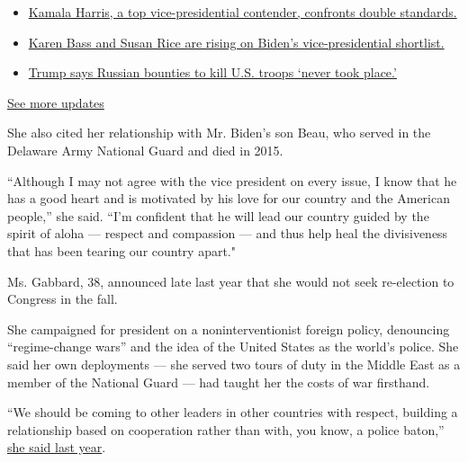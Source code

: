\begin{itemize}
\tightlist
\item
  \href{https://www.nytimes.com/2020/07/31/us/elections/biden-vs-trump.html?action=click\&pgtype=Article\&state=default\&region=MAIN_CONTENT_1\&context=storylines_live_updates\#link-29fdff45}{Kamala
  Harris, a top vice-presidential contender, confronts double
  standards.}
\item
  \href{https://www.nytimes.com/2020/07/31/us/elections/biden-vs-trump.html?action=click\&pgtype=Article\&state=default\&region=MAIN_CONTENT_1\&context=storylines_live_updates\#link-13ec3d9c}{Karen
  Bass and Susan Rice are rising on Biden's vice-presidential
  shortlist.}
\item
  \href{https://www.nytimes.com/2020/07/31/us/elections/biden-vs-trump.html?action=click\&pgtype=Article\&state=default\&region=MAIN_CONTENT_1\&context=storylines_live_updates\#link-49e9a016}{Trump
  says Russian bounties to kill U.S. troops `never took place.'}
\end{itemize}

\href{https://www.nytimes.com/2020/07/31/us/elections/biden-vs-trump.html?action=click\&pgtype=Article\&state=default\&region=MAIN_CONTENT_1\&context=storylines_live_updates}{See
more updates}

She also cited her relationship with Mr. Biden's son Beau, who served in
the Delaware Army National Guard and died in 2015.

``Although I may not agree with the vice president on every issue, I
know that he has a good heart and is motivated by his love for our
country and the American people,'' she said. ``I'm confident that he
will lead our country guided by the spirit of aloha --- respect and
compassion --- and thus help heal the divisiveness that has been tearing
our country apart."

Ms. Gabbard, 38, announced late last year that she would not seek
re-election to Congress in the fall.

She campaigned for president on a noninterventionist foreign policy,
denouncing ``regime-change wars'' and the idea of the United States as
the world's police. She said her own deployments --- she served two
tours of duty in the Middle East as a member of the National Guard ---
had taught her the costs of war firsthand.

``We should be coming to other leaders in other countries with respect,
building a relationship based on cooperation rather than with, you know,
a police baton,''
\href{https://www.nytimes.com/2019/08/02/us/politics/tulsi-gabbard-2020-presidential-race.html}{she
said last year}.

